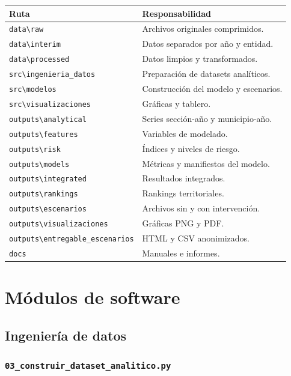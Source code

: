 \documentclass[11pt,a4paper]{article}
\newcommand{\ruta}[1]{\texttt{\small #1}}
\begin{document}
\begin{longtable}{p{}p{}}
\toprule
\textbf{Ruta} & \textbf{Responsabilidad}\\
\midrule
\ruta{data\textbackslash raw} & Archivos originales comprimidos.\\
\ruta{data\textbackslash interim} & Datos separados por año y entidad.\\
\ruta{data\textbackslash processed} & Datos limpios y transformados.\\
\ruta{src\textbackslash ingenieria\_datos} & Preparación de datasets analíticos.\\
\ruta{src\textbackslash modelos} & Construcción del modelo y escenarios.\\
\ruta{src\textbackslash visualizaciones} & Gráficas y tablero.\\
\ruta{outputs\textbackslash analytical} & Series sección-año y municipio-año.\\
\ruta{outputs\textbackslash features} & Variables de modelado.\\
\ruta{outputs\textbackslash risk} & Índices y niveles de riesgo.\\
\ruta{outputs\textbackslash models} & Métricas y manifiestos del modelo.\\
\ruta{outputs\textbackslash integrated} & Resultados integrados.\\
\ruta{outputs\textbackslash rankings} & Rankings territoriales.\\
\ruta{outputs\textbackslash escenarios} & Archivos sin y con intervención.\\
\ruta{outputs\textbackslash visualizaciones} & Gráficas PNG y PDF.\\
\ruta{outputs\textbackslash entregable\_escenarios} & HTML y CSV anonimizados.\\
\ruta{docs} & Manuales e informes.\\
\bottomrule
\end{longtable}

\section{Módulos de software}

\subsection{Ingeniería de datos}

\subsubsection{\ruta{03\_construir\_dataset\_analitico.py}}
\end{document}
